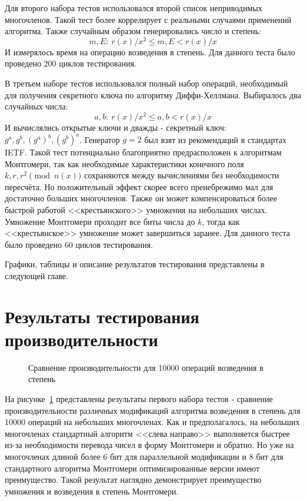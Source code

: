 \documentclass[times,specification,annotation]{itmo-student-thesis}
\begin{document}
Для второго набора тестов использовался второй список неприводимых многочленов.
Такой тест более коррелирует с реальными случаями применений алгоритма.
Также случайным образом генерировались число и степень:
\[m, E:~r(x)/x^2 \leq m, E < r(x)/x\]
И измерялось время на операцию возведения в степень.
Для данного теста было проведено 200 циклов тестирования.

В третьем наборе тестов использовался полный набор операций, необходимый для получения секретного ключа по алгоритму Диффи-Хеллмана.
Выбиралось два случайных числа:
\[a, b:~r(x)/x^2 \leq a,b < r(x)/x\]
И вычислялись открытые ключи и дважды - секретный ключ: $g^a, g^b, (g^a)^b, (g^b)^a$.
Генератор $g = 2$ был взят из рекомендаций в стандартах IETF.
Такой тест потенциально благоприятно предрасположен к алгоритмам Монтгомери, так как необходимые характеристики конечного поля
$k, r, r^2 \pmod{n(x)}$ сохраняются между вычислениями без необходимости пересчёта.
Но положительный эффект скорее всего пренебрежимо мал для достаточно больших многочленов.
Также он может компенсироваться более быстрой работой <<крестьянского>> умножения на небольших числах.
Умножение Монтгомери проходит все биты числа до $k$, тогда как <<крестьянское>> умножение может завершиться заранее.
Для данного теста было проведено 60 циклов тестирования.

Графики, таблицы и описание результатов тестирования представлены в следующей главе.

\section{Результаты тестирования производительности}\label{sec:results}

\begin{figure}[!h]
\caption{Сравнение производительности для 10000 операций возведения в степень}\label{fig:res}

\end{figure}

На рисунке~\ref{fig:res} представлены результаты первого набора тестов - сравнение производительности различных
модификаций алгоритма возведения в степень для 10000 операций на небольших многочленах.
Как и предполагалось, на небольших многочленах стандартный алгоритм <<слева направо>> выполняется быстрее из-за
необходимости перевода чисел в форму Монтгомери и обратно.
Но уже на многочленах длиной более 6 бит для параллельной модификации и 8 бит для стандартного алгоритма Монтгомери
оптимизированные версии имеют преимущество.
Такой результат наглядно демонстрирует преимущество умножения и возведения в степень Монтгомери.
\end{document}
